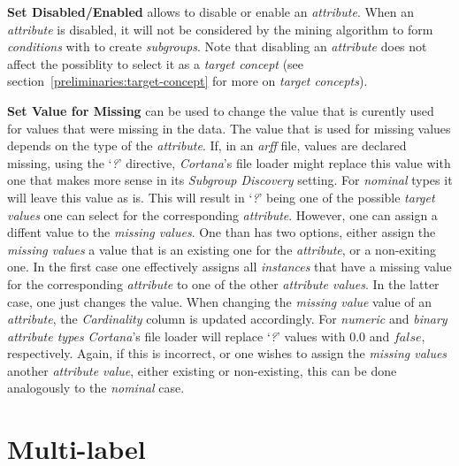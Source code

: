 \documentclass{article}
\begin{document}
\textbf{Set Disabled/Enabled} allows to disable or enable an \emph{attribute}.
When an \emph{attribute} is disabled, it will not be considered by the mining algorithm to form \emph{conditions} with to create \emph{subgroups}.
Note that disabling an \emph{attribute} does not affect the possiblity to select it as a \emph{target concept} (see section~\ref{preliminaries:target-concept} for more on \emph{target concepts}).

\textbf{Set Value for Missing} can be used to change the value that is curently used for values that were missing in the data.
The value that is used for missing values depends on the type of the \emph{attribute}.
If, in an \emph{arff} file, values are declared missing, using the `\emph{?}' directive, \emph{Cortana}'s file loader might replace this value with one that makes more sense in its \emph{Subgroup Discovery} setting.
For \emph{nominal} types it will leave this value as is.
This will result in `\emph{?}' being one of the possible \emph{target values} one can select for the corresponding \emph{attribute}.
However, one can assign a diffent value to the \emph{missing values}.
One than has two options, either assign the \emph{missing values} a value that is an existing one for the \emph{attribute}, or a non-exiting one.
In the first case one effectively assigns all \emph{instances} that have a missing value for the corresponding \emph{attribute} to one of the other \emph{attribute values}.
In the latter case, one just changes the value.
When changing the \emph{missing value} value of an \emph{attribute}, the \emph{Cardinality} column is updated accordingly.
For \emph{numeric} and \emph{binary} \emph{attribute types} \emph{Cortana}'s file loader will replace `\emph{?}' values with $0.0$ and $false$, respectively.
Again, if this is incorrect, or one wishes to assign the \emph{missing values} another \emph{attribute value}, either existing or non-existing, this can be done analogously to the \emph{nominal} case.





\section{Multi-label}
\label{section:multi-label}
\end{document}
